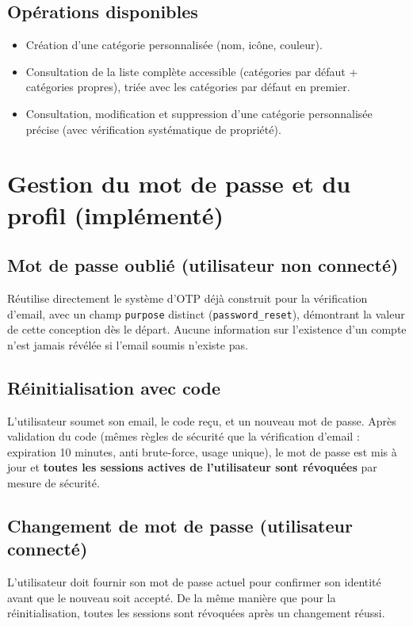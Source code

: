 \documentclass[11pt,a4paper]{article}
\begin{document}
\subsection{Opérations disponibles}
\begin{itemize}[leftmargin=*]
    \item Création d'une catégorie personnalisée (nom, icône, couleur).
    \item Consultation de la liste complète accessible (catégories par défaut + catégories propres), triée avec les catégories par défaut en premier.
    \item Consultation, modification et suppression d'une catégorie personnalisée précise (avec vérification systématique de propriété).
\end{itemize}

\section{Gestion du mot de passe et du profil (implémenté)}

\subsection{Mot de passe oublié (utilisateur non connecté)}
Réutilise directement le système d'OTP déjà construit pour la vérification d'email, avec un champ \texttt{purpose} distinct (\texttt{password\_reset}), démontrant la valeur de cette conception dès le départ. Aucune information sur l'existence d'un compte n'est jamais révélée si l'email soumis n'existe pas.

\subsection{Réinitialisation avec code}
L'utilisateur soumet son email, le code reçu, et un nouveau mot de passe. Après validation du code (mêmes règles de sécurité que la vérification d'email : expiration 10 minutes, anti brute-force, usage unique), le mot de passe est mis à jour et \textbf{toutes les sessions actives de l'utilisateur sont révoquées} par mesure de sécurité.

\subsection{Changement de mot de passe (utilisateur connecté)}
L'utilisateur doit fournir son mot de passe actuel pour confirmer son identité avant que le nouveau soit accepté. De la même manière que pour la réinitialisation, toutes les sessions sont révoquées après un changement réussi.
\end{document}
